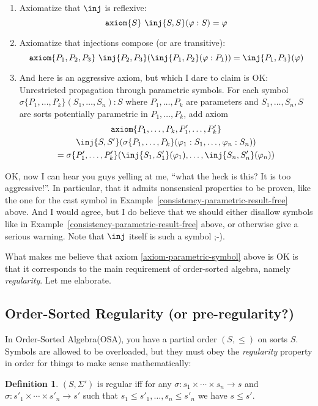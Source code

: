 \documentclass{article}
\theoremstyle{definition}
\theoremstyle{definition}
\theoremstyle{definition}
\newtheorem{definition}{Definition}[section]
\theoremstyle{definition}
\theoremstyle{theorem}
\theoremstyle{theorem}
\theoremstyle{theorem}
\theoremstyle{theorem}
\theoremstyle{theorem}
\newcommand{\axiom}{\texttt{axiom}}
\begin{document}
\begin{enumerate}[label=(\arabic*)]
\item\label{axiom-reflexive}
Axiomatize that \(\inj\) is reflexive:
\[\axiom\{S\}\ \inj\{S,S\}(\varphi:S) = \varphi\]

\item\label{axiom-transitive}
Axiomatize that injections compose (or are transitive):
\[\axiom\{P_1,P_2,P_3\}\ \inj\{P_2,P_3\}(\inj\{P_1,P_2\}(\varphi:P_1))
 = \inj\{P_1,P_3\}(\varphi)\]

\item\label{axiom-parametric-symbol}
And here is an aggressive axiom, but which I dare to claim is OK:
Unrestricted propagation through parametric symbols.
For each symbol \(\sigma\{P_1,\ldots,P_k\}(S_1,\ldots,S_n):S\)
where \(P_1,\ldots,P_k\) are parameters and
\(S_1,\ldots,S_n,S\) are sorts potentially parametric in
\(P_1,\ldots,P_k\), add axiom
\begin{multline*}
\axiom\{P_1,\ldots,P_k,P'_1,\ldots,P'_k\}\\
\inj\{S,S'\}(\sigma\{P_1,\ldots,P_k\}(\varphi_1:S_1,\ldots,\varphi_n:S_n))\\
= \sigma\{P'_1,\ldots,P'_k\}(\inj\{S_1,S'_1\}(\varphi_1),\ldots,\inj\{S_n,S'_n\}(\varphi_n))
\end{multline*}
\end{enumerate}

OK, now I can hear you guys yelling at me,
``what the heck is this? It is too aggressive!''.
In particular, that it admits nonsensical properties to be proven,
like the one for the cast symbol in Example~\ref{consistency-parametric-result-free} above.
And I would agree, but I do believe that we
should either disallow symbols like in Example~\ref{consistency-parametric-result-free}
above, or otherwise give a serious warning.
Note that \(\inj\) itself is such a symbol ;-).

What makes me believe that axiom \ref{axiom-parametric-symbol}
above is OK is that it corresponds to the main requirement of
order-sorted algebra, namely \emph{regularity}.
Let me elaborate.

\subsection{Order-Sorted Regularity (or pre-regularity?)}
In Order-Sorted Algebra(OSA), you have a partial order \((S,\le)\) on sorts \(S\).
Symbols are allowed to be overloaded, but they must obey the
\emph{regularity} property in order for things to make sense
mathematically:

\begin{definition}
\((S,\Sigma')\) is regular iff for any
\(\sigma:s_1\times\cdots\times s_n \rightarrow s\) and
\(\sigma:s'_1\times\cdots\times s'_n \rightarrow s'\) such that
\(s_1\le s'_1,\ldots,s_n\le s'_n\) we have \(s \le s'\).
\end{definition}
\end{document}
